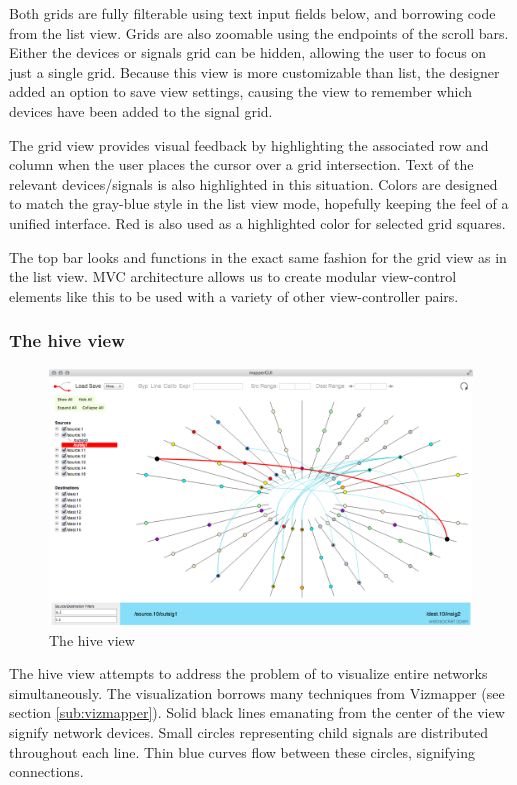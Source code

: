 Both grids are fully filterable using text input fields below, and borrowing code from the list view. Grids are also zoomable using the endpoints of the scroll bars. Either the devices or signals grid can be hidden, allowing the user to focus on just a single grid. Because this view is more customizable than list, the designer added an option to save view settings, causing the view to remember which devices have been added to the signal grid.

The grid view provides visual feedback by highlighting the associated row and column when the user places the cursor over a grid intersection. Text of the relevant devices/signals is also highlighted in this situation. Colors are designed to match the gray-blue style in the list view mode, hopefully keeping the feel of a unified interface. Red is also used as a highlighted color for selected grid squares.

The top bar looks and functions in the exact same fashion for the grid view as in the list view. MVC architecture allows us to create modular view-control elements like this to be used with a variety of other view-controller pairs.

	\subsubsection{The hive view}

\begin{figure}[ht]
\centering
	\includegraphics[width=\textwidth]{figures/hive}
\caption{The hive view}
\label{fig:hive}
\end{figure}
	
The hive view attempts to address the problem of to visualize entire networks simultaneously. The visualization borrows many techniques from Vizmapper (see section \ref{sub:vizmapper}). Solid black lines emanating from the center of the view signify network devices. Small circles representing child signals are distributed throughout each line. Thin blue curves flow between these circles, signifying connections. 

